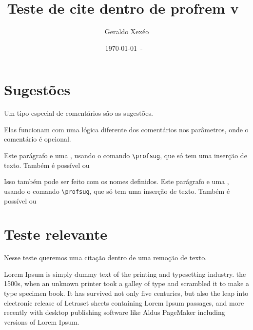 \documentclass{article}
\title{Teste de cite dentro de profrem v\ \hacksxexeoversion}
\author{Geraldo Xexéo}
\date{\today\ - \ \currenttime}
\begin{document}
    
    \maketitle
    
    \tableofcontents
    
\section{Sugestões}

Um tipo especial de comentários são as sugestões.

Elas funcionam com uma lógica diferente dos comentários nos parâmetros, onde o comentário é opcional.

Este parágrafo  e 
uma , usando o comando \verb*|\profsug|, que só tem uma inserção de texto. Também é possível  ou 

Isso também pode ser feito com os nomes definidos. 
Este parágrafo  e 
uma , usando o comando \verb*|\profsug|, que só tem uma inserção de texto. Também é possível  ou 


\section{Teste relevante}


Nesse teste queremos uma citação dentro de uma remoção de texto.

Lorem Ipsum is simply dummy text of the printing and typesetting industry.  the 1500s, when an unknown printer took a galley of type and scrambled it to make a type specimen book. It has survived not only five centuries, but also the leap into electronic  release of Letraset sheets containing Lorem Ipsum passages, and more recently with desktop publishing software like Aldus PageMaker including versions of Lorem Ipsum.
\end{document}
